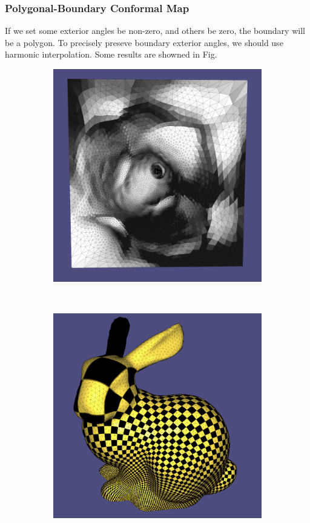 \subsubsection{Polygonal-Boundary Conformal Map}
If we set some exterior angles be non-zero, and others be zero, the boundary will be a polygon. To precisely preseve boundary exterior angles, we should use harmonic interpolation. Some results are showned in Fig. 

\begin{figure}
\centering
\begin{subfigure}{0.3\textwidth}
\includegraphics[height = \textwidth]{images/bunny_polygon_emb}
\caption{}
\end{subfigure}\ \ \ \ \ \ \ \ \ \ \ \ \
\begin{subfigure}{0.3\textwidth}
\includegraphics[height = \textwidth]{images/bunny_polygon_texture}

\end{subfigure}
\end{figure}

